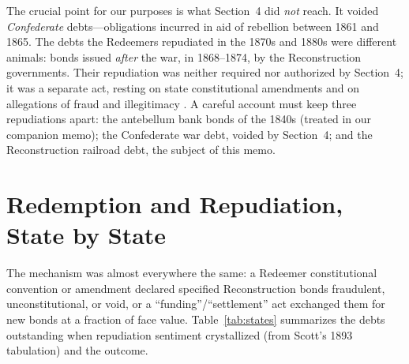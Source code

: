\documentclass[12pt]{article}
\begin{document}
The crucial point for our purposes is what Section~4 did \emph{not} reach. It voided
\emph{Confederate} debts---obligations incurred in aid of rebellion between 1861 and
1865. The debts the Redeemers repudiated in the 1870s and 1880s were different
animals: bonds issued \emph{after} the war, in 1868--1874, by the Reconstruction
governments. Their repudiation was neither required nor authorized by Section~4; it
was a separate act, resting on state constitutional amendments and on allegations of
fraud and illegitimacy \citep{scott1893repudiation, ratchford1941american}. A
careful account must keep three repudiations apart: the antebellum bank bonds of the
1840s (treated in our companion memo); the Confederate war debt, voided by
Section~4; and the Reconstruction railroad debt, the subject of this memo.

\section{Redemption and Repudiation, State by State}
\label{sec:states}

The mechanism was almost everywhere the same: a Redeemer constitutional convention
or amendment declared specified Reconstruction bonds fraudulent, unconstitutional,
or void, or a ``funding''/``settlement'' act exchanged them for new bonds at a
fraction of face value. Table~\ref{tab:states} summarizes the debts outstanding when
repudiation sentiment crystallized (from Scott's 1893 tabulation) and the outcome.
\end{document}
